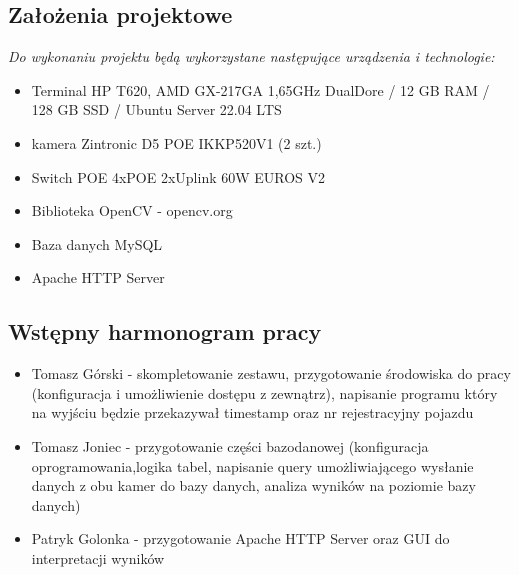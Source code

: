 \documentclass[12pt,a4paper,oneside]{article}
\theoremstyle{definition}
\numberwithin{equation}{section}
\begin{document}
\subsection{Założenia projektowe}
\textit{Do wykonaniu projektu będą wykorzystane następujące urządzenia i technologie: }
\begin{itemize}
  \item Terminal HP T620, AMD GX-217GA 1,65GHz DualDore / 12 GB RAM / 128 GB SSD / Ubuntu Server 22.04 LTS
  \item kamera Zintronic D5 POE IKKP520V1 (2 szt.)  
  \item Switch POE 4xPOE 2xUplink 60W EUROS V2
  \item Biblioteka OpenCV - opencv.org
  \item Baza danych MySQL
  \item Apache HTTP Server
\end{itemize}
\subsection{Wstępny harmonogram pracy}
\begin{itemize}
  \item Tomasz Górski - skompletowanie zestawu, przygotowanie środowiska do pracy (konfiguracja i umożliwienie dostępu z zewnątrz), napisanie programu który na wyjściu będzie przekazywał timestamp oraz nr rejestracyjny pojazdu 
  \item Tomasz Joniec - przygotowanie części bazodanowej (konfiguracja oprogramowania,logika tabel, napisanie query umożliwiającego wysłanie danych z obu kamer do bazy danych, analiza wyników na poziomie bazy danych)
  \item Patryk Golonka - przygotowanie Apache HTTP Server oraz GUI do interpretacji wyników
\end{itemize}



%
%
%
%
\end{document}

